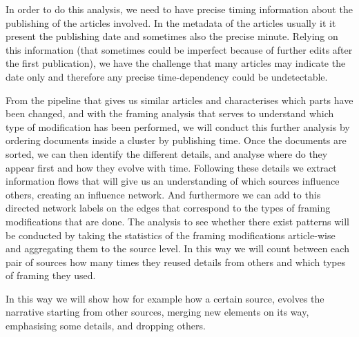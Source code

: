 In order to do this analysis, we need to have precise timing information about the publishing of the articles involved.
In the metadata of the articles usually it it present the publishing date and sometimes also the precise minute.
Relying on this information (that sometimes could be imperfect because of further edits after the first publication), we have the challenge that many articles may indicate the date only and therefore any precise time-dependency could be undetectable.

From the pipeline that gives us similar articles and characterises which parts have been changed, and with the framing analysis that serves to understand which type of modification has been performed, we will conduct this further analysis by ordering documents inside a cluster by publishing time.
Once the documents are sorted, we can then identify the different details, and analyse where do they appear first and how they evolve with time.
Following these details we extract information flows that will give us an understanding of which sources influence others, creating an influence network.
And furthermore we can add to this directed network labels on the edges that correspond to the types of framing modifications that are done.
The analysis to see whether there exist patterns will be conducted by taking the statistics of the framing modifications article-wise and aggregating them to the source level.
In this way we will count between each pair of sources how many times they reused details from others and which types of framing they used.

In this way we will show how for example how a certain source, evolves the narrative starting from other sources, merging new elements on its way, emphasising some details, and dropping others.







